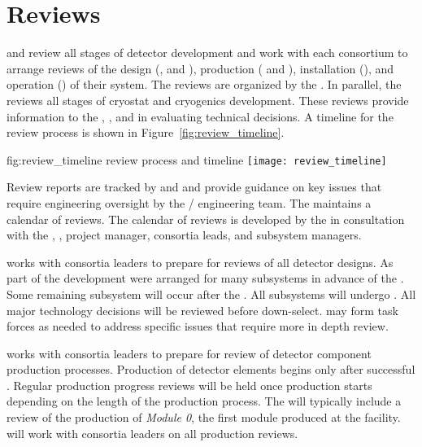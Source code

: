 \chapter{Reviews}
\label{vl:tc-review}

 and  review all stages of detector development
and work with each consortium to arrange reviews of the design
(,  and ), production (
and ), installation (), and operation
() of their system. The reviews are organized by the
 . In parallel, the   reviews all
stages of  cryostat and cryogenics development.  These
reviews provide information to the , , and 
in evaluating technical decisions. A timeline for the review process
is shown in Figure~\ref{fig:review_timeline}.
\begin{dunefigure}{fig:review_timeline}
  { review process and timeline}
  \texttt{[image: review\_timeline]}
\end{dunefigure}
Review reports are tracked by  and  and provide
guidance on key issues that require engineering oversight by the
/ engineering team. The   maintains a
calendar of  reviews. The calendar of reviews is developed
by the   in consultation with the ,
,  project manager, consortia leads, and
 subsystem managers.

 works with consortia leaders to prepare for reviews of all detector
designs.  As part of the  development  were
arranged for many subsystems in advance of the . Some
remaining subsystem  will occur after the . All
subsystems will undergo .  All major technology decisions
will be reviewed before down-select.   may form task forces
as needed to address specific issues that require more in depth
review.


 works with consortia leaders to prepare for review of
detector component production processes.  Production of detector
elements begins only after successful . Regular production
progress reviews will be held once production starts depending on the
length of the production process. The  will typically
include a review of the production of \textit{Module 0}, the first
module produced at the facility.  will work with consortia
leaders on all production reviews.

